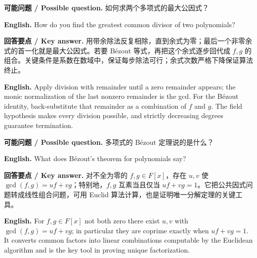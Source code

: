 \documentclass[UTF8,11pt,a4paper]{ctexart}
\newcommand{\EN}[1]{\par\noindent\textbf{English.} #1\par}
\newcommand{\ASK}[4]{\par\noindent\textbf{可能问题 / Possible question.} #1\par\EN{#2}\noindent\textbf{回答要点 / Key answer.} #3\par\EN{#4}\medskip}
\begin{document}
\ASK{如何求两个多项式的最大公因式？}{How do you find the greatest common divisor of two polynomials?}{用带余除法反复相除，直到余式为零；最后一个非零余式的首一化就是最大公因式。若要 Bézout 等式，再把这个余式逐步回代成 $f,g$ 的组合。关键条件是系数在数域中，保证每步除法可行；余式次数严格下降保证算法终止。}{Apply division with remainder until a zero remainder appears; the monic normalization of the last nonzero remainder is the gcd. For the Bézout identity, back-substitute that remainder as a combination of $f$ and $g$. The field hypothesis makes every division possible, and strictly decreasing degrees guarantee termination.}
\ASK{多项式的 Bézout 定理说的是什么？}{What does Bézout's theorem for polynomials say?}{对不全为零的 $f,g\in F[x]$，存在 $u,v$ 使 $\gcd(f,g)=uf+vg$；特别地，$f,g$ 互素当且仅当 $uf+vg=1$。它把公共因式问题转成线性组合问题，可用 Euclid 算法计算，也是证明唯一分解定理的关键工具。}{For $f,g\in F[x]$ not both zero there exist $u,v$ with $\gcd(f,g)=uf+vg$; in particular they are coprime exactly when $uf+vg=1$. It converts common factors into linear combinations computable by the Euclidean algorithm and is the key tool in proving unique factorization.}
\end{document}
